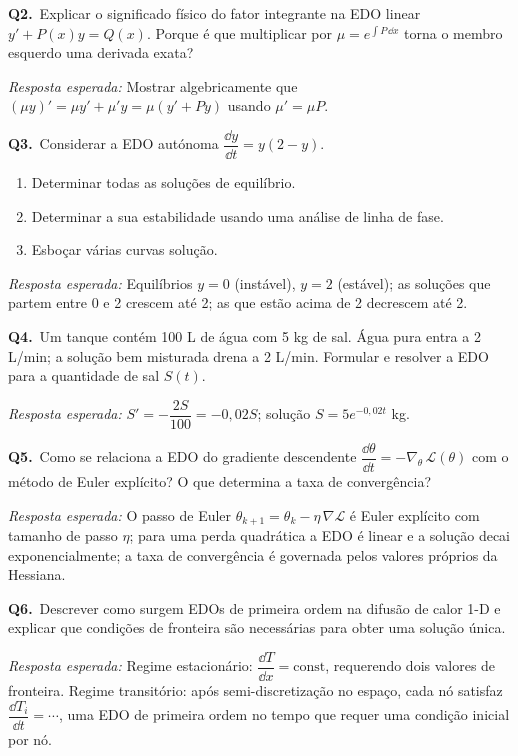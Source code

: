 \begin{oralbox}
  \textbf{Q2.}\ Explicar o significado físico do fator integrante na EDO linear
  $y' + P(x)y = Q(x)$. Porque é que multiplicar por $\mu = e^{\int P\,\dd x}$ torna
  o membro esquerdo uma derivada exata?

  \medskip
  \textit{Resposta esperada:} Mostrar algebricamente que $(\mu y)' = \mu y' + \mu'y =
  \mu(y'+Py)$ usando $\mu'=\mu P$.
\end{oralbox}

\begin{oralbox}
  \textbf{Q3.}\ Considerar a EDO autónoma $\dfrac{\dd y}{\dd t} = y(2-y)$.
  \begin{enumerate}[label=(\alph*)]
    \item Determinar todas as soluções de equilíbrio.
    \item Determinar a sua estabilidade usando uma análise de linha de fase.
    \item Esboçar várias curvas solução.
  \end{enumerate}
  \textit{Resposta esperada:} Equilíbrios $y=0$ (instável), $y=2$ (estável); as soluções
  que partem entre 0 e 2 crescem até 2; as que estão acima de 2 decrescem até 2.
\end{oralbox}

\begin{oralbox}
  \textbf{Q4.}\ Um tanque contém 100 L de água com 5 kg de sal. Água pura entra a
  2 L/min; a solução bem misturada drena a 2 L/min. Formular e resolver a EDO para a
  quantidade de sal $S(t)$.

  \medskip
  \textit{Resposta esperada:} $S' = -\dfrac{2S}{100} = -0{,}02S$; solução
  $S = 5e^{-0{,}02t}$ kg.
\end{oralbox}

\begin{oralbox}
  \textbf{Q5.}\ Como se relaciona a EDO do gradiente descendente
  $\dfrac{\dd\theta}{\dd t} = -\nabla_{\!\theta}\,\mathcal{L}(\theta)$
  com o método de Euler explícito? O que determina a taxa de convergência?

  \medskip
  \textit{Resposta esperada:} O passo de Euler $\theta_{k+1}=\theta_k -
  \eta\,\nabla\mathcal{L}$ é Euler explícito com tamanho de passo $\eta$; para uma perda
  quadrática a EDO é linear e a solução decai exponencialmente; a taxa de convergência é
  governada pelos valores próprios da Hessiana.
\end{oralbox}

\begin{oralbox}
  \textbf{Q6.}\ Descrever como surgem EDOs de primeira ordem na difusão de calor 1-D e
  explicar que condições de fronteira são necessárias para obter uma solução única.

  \medskip
  \textit{Resposta esperada:} Regime estacionário: $\dfrac{\dd T}{\dd x}=\mathrm{const}$,
  requerendo dois valores de fronteira. Regime transitório: após semi-discretização no
  espaço, cada nó satisfaz $\dfrac{\dd T_i}{\dd t} = \cdots$, uma EDO de primeira ordem
  no tempo que requer uma condição inicial por nó.
\end{oralbox}

